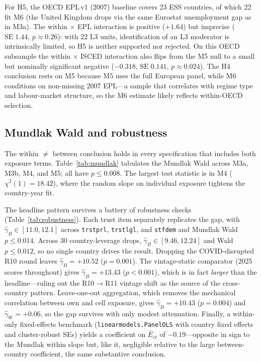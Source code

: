 For H5, the OECD EPL\,v1 (2007) baseline covers 23 ESS countries, of
which 22 fit M6 (the United Kingdom drops via the same Eurostat
unemployment gap as in M3a). The within $\times$ EPL interaction is
positive ($+1.64$) but imprecise ($\mathrm{SE}\;1.44$, $p\approx 0.26$):
with 22 L3 units, identification of an L3 moderator is intrinsically
limited, so H5 is neither supported nor rejected. On this OECD
subsample the within $\times$ ISCED interaction also flips from the M5
null to a small but nominally significant negative ($-0.318$,
$\mathrm{SE}\;0.141$, $p\approx 0.024$). The H4 conclusion rests on M5
because M5 uses the full European panel, while M6 conditions on
non-missing 2007 EPL---a sample that correlates with regime type and
labour-market structure, so the M6 estimate likely reflects
within-OECD selection.



\subsection{Mundlak Wald and robustness}\label{sec:results-robust}

The within $\neq$ between conclusion holds in every specification that
includes both exposure terms. Table~\ref{tab:mundlak} tabulates the
Mundlak Wald across M3a, M3b, M4, and M5; all have $p\leq 0.008$. The
largest test statistic is in M4 ($\chi^2(1)=18.42$), where the random
slope on individual exposure tightens the country-year fit.



The headline pattern survives a battery of robustness checks
(Table~\ref{tab:robustness}). Each trust item separately replicates the
gap, with $\hat\gamma_B \in [11.0, 12.1]$ across \texttt{trstprl},
\texttt{trstlgl}, and \texttt{stfdem} and Mundlak Wald $p \leq 0.014$.
Across 30 country-leverage drops, $\hat\gamma_B \in [9.46, 12.24]$ and
Wald $p \leq 0.012$, so no single country drives the result. Dropping
the COVID-disrupted R10 round leaves $\hat\gamma_B = +10.52$ ($p=0.001$).
The vintage-static comparator (2025 scores throughout) gives
$\hat\gamma_B = +13.43$ ($p<0.001$), which is in fact \emph{larger} than
the headline---ruling out the R10$\to$R11 vintage shift as the source
of the cross-country pattern. Leave-one-out aggregation, which removes
the mechanical correlation between own and cell exposure, gives
$\hat\gamma_B = +10.43$ ($p=0.004$) and $\hat\gamma_W = +0.06$, so the
gap survives with only modest attenuation. Finally, a within-only
fixed-effects benchmark (\texttt{linearmodels.PanelOLS} with country
fixed effects and cluster-robust SEs) yields a coefficient on
$\bar E_{ct}$ of $-0.19$---opposite in sign to the Mundlak within slope
but, like it, negligible relative to the large between-country
coefficient, the same substantive conclusion.


